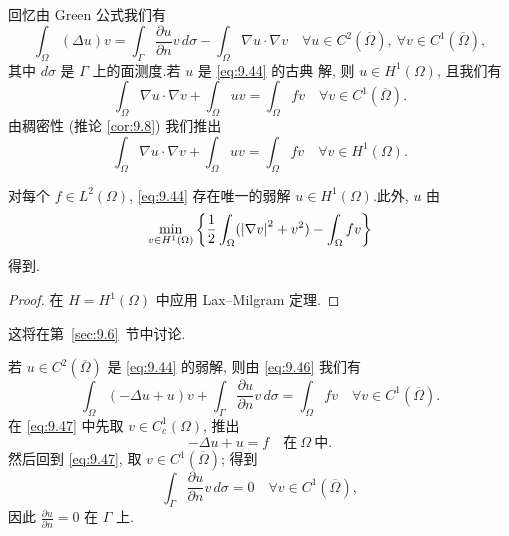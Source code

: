 
回忆由 Green 公式我们有
\begin{equation}
\int_\Omega(\Delta u)v=\int_\Gamma\frac{\partial u}{\partial n}v\,d\sigma
-\int_\Omega\nabla u\cdot\nabla v
\quad\forall u\in C^2(\overline\Omega),\ \forall v\in C^1(\overline\Omega),
\label{eq:9.46}
\end{equation}
其中 $d\sigma$ 是 $\Gamma$ 上的面测度.若 $u$ 是 \eqref{eq:9.44} 的古典
解, 则 $u\in H^1(\Omega)$, 且我们有
\begin{equation*}
\int_\Omega\nabla u\cdot\nabla v+\int_\Omega uv=\int_\Omega fv
\quad\forall v\in C^1(\overline\Omega).
\end{equation*}
由稠密性 (推论  \ref{cor:9.8}) 我们推出
\begin{equation*}
\int_\Omega\nabla u\cdot\nabla v+\int_\Omega uv=\int_\Omega fv
\quad\forall v\in H^1(\Omega).
\end{equation*}


\begin{proposition}
\label{prop:9.24}
对每个 $f\in L^2(\Omega)$, \eqref{eq:9.44} 存在唯一的弱解
$u\in H^1(\Omega)$.此外, $u$ 由
\begin{equation*}
\min_{v\in H^1(\Omega)}\left\{\frac12\int_\Omega
(\left|\nabla v\right|^2+v^2)-\int_\Omega fv\right\}
\end{equation*}
得到.
\end{proposition}

\begin{proof}
在 $H=H^1(\Omega)$ 中应用 Lax--Milgram 定理.
\end{proof}


这将在第~\ref{sec:9.6}~节中讨论.


若 $u\in C^2(\overline\Omega)$ 是 \eqref{eq:9.44} 的弱解, 则由
\eqref{eq:9.46} 我们有
\begin{equation}
\int_\Omega(-\Delta u+u)v+\int_\Gamma\frac{\partial u}{\partial n}
v\,d\sigma=\int_\Omega fv\quad\forall v\in C^1(\overline\Omega).
\label{eq:9.47}
\end{equation}
在 \eqref{eq:9.47} 中先取 $v\in C_c^1(\Omega)$, 推出
\begin{equation*}
-\Delta u+u=f\quad\text{在}\ \Omega\ \text{中}.
\end{equation*}
然后回到 \eqref{eq:9.47}, 取 $v\in C^1(\overline\Omega)$; 得到
\begin{equation*}
\int_\Gamma\frac{\partial u}{\partial n}v\,d\sigma=0
\quad\forall v\in C^1(\overline\Omega),
\end{equation*}
因此 $\frac{\partial u}{\partial n}=0$ 在 $\Gamma$ 上.

